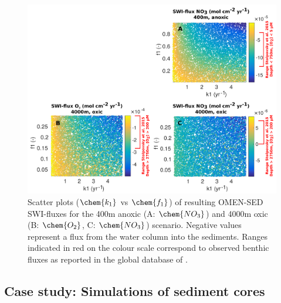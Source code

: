 \documentclass[gmd, manuscript]{copernicus}
\begin{document}
\begin{figure}[htbp]
\begin{center}
	\includegraphics[width=1.0\textwidth]{figures/SA/k1_vs_f1_SWIflux_COMBINED_1604.pdf}
	\caption{Scatter plots ($\chem{k_1}$ vs $\chem{f_1}$) of resulting OMEN-SED SWI-fluxes for the 400m anoxic (A: $\chem{NO_3}$) and 4000m oxic (B: $\chem{O_2}$, C: $\chem{NO_3}$) scenario. 
	Negative values represent a flux from the water column into the sediments.
	Ranges indicated in red on the colour scale correspond to observed benthic fluxes as reported in the global database of \citet{stolpovsky_toward_2015}. 
}\label{fig:SA_Color_ScatterPlots}
\end{center}
\end{figure}


\subsection{Case study: Simulations of sediment cores}\label{subsec:SedProfiles}
\end{document}
